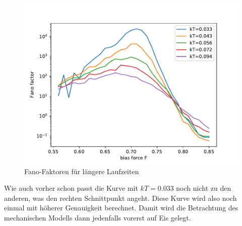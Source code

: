 \documentclass[12pt,a4paper]{article}
\begin{document}
\begin{figure}[H]
	\centering
	\includegraphics[scale=0.9]{fmechex.pdf} 
	\caption{Fano-Faktoren für längere Laufzeiten}
	\label{fex}
\end{figure} 
Wie auch vorher schon passt die Kurve mit $kT=0.033$ noch nicht zu den anderen, was den rechten Schnittpunkt angeht. Diese Kurve wird also noch einmal mit höherer Genauigkeit berechnet. Damit wird die Betrachtung des mechanischen Modells dann jedenfalls vorerst auf Eis gelegt. 
\end{document}
